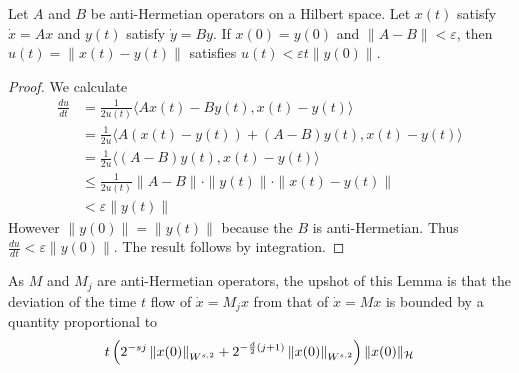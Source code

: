 \begin{lemma}
Let $A$ and $B$ be anti-Hermetian operators on a Hilbert space.  Let $x(t)$ satisfy $\dot{x} = Ax$ and $y(t)$ satisfy $\dot{y} = By$.  If $x(0) = y(0)$ and $\| A - B \| < \varepsilon$, then $u(t) = \| x(t) - y(t) \|$ satisfies $u(t) < \varepsilon t  \| y(0) \|$.
\end{lemma}

\begin{proof}
	We calculate
	\begin{align*}
		\frac{du}{dt} &= \frac{1}{2u(t)} \langle Ax(t) - By(t) , x(t) - y(t) \rangle \\
			&= \frac{1}{2u} \langle A(x(t)-y(t)) + (A-B) y(t) , x(t) - y(t) \rangle \\
			&= \frac{1}{2u} \langle (A-B)y(t) , x(t) - y(t) \rangle \\
			&\leq \frac{1}{2u(t)} \| A - B \| \cdot \| y(t) \| \cdot \| x(t) - y(t) \| \\
			&< \varepsilon \| y(t) \|
	\end{align*}
	However $\| y(0) \| = \| y(t)\|$ because the $B$ is anti-Hermetian.  Thus $\frac{du}{dt} < \varepsilon \| y(0)\|$.	The result follows by integration.
\end{proof}
As $M$ and $M_j$ are anti-Hermetian operators, the upshot of this Lemma is that the deviation of the time $t$ flow of $\dot{x} = M_j x$ from that of $\dot{x} = Mx$ is bounded by a quantity proportional to
\[
 	t \left( 2^{-sj}\left\| x(0) \right\|_{W^{s,2}} + 2^{-\frac{d}{2}(j+1)}\left\| x(0) \right\|_{W^{s,2}} \right) \| x (0) \|_{\mathcal{H}}
\]
